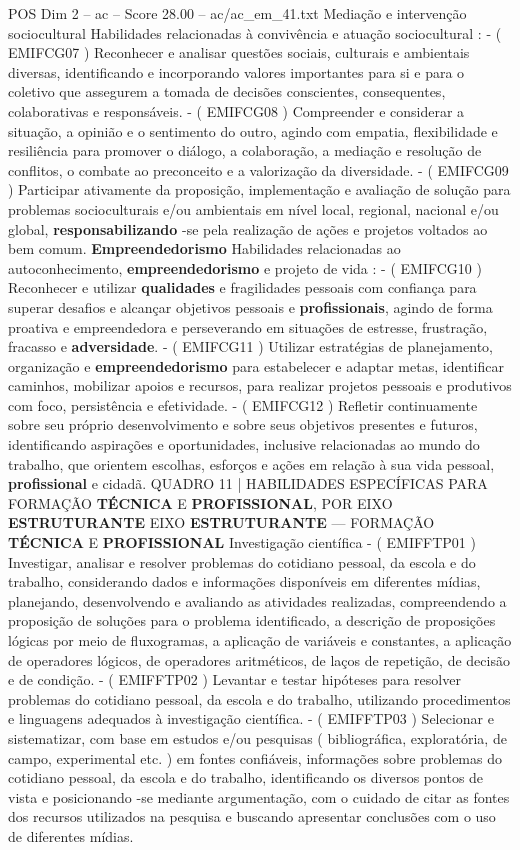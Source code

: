 \begin{textsample}{POS Dim 2 – ac – Score 28.00 – ac/ac\_em\_41.txt}
Mediação e intervenção sociocultural Habilidades relacionadas à convivência e atuação sociocultural : - ( EMIFCG07 ) Reconhecer e analisar questões sociais, culturais e ambientais diversas, identificando e incorporando valores importantes para si e para o coletivo que assegurem a tomada de decisões conscientes, consequentes, colaborativas e responsáveis. - ( EMIFCG08 ) Compreender e considerar a situação, a opinião e o sentimento do outro, agindo com empatia, flexibilidade e resiliência para promover o diálogo, a colaboração, a mediação e resolução de conflitos, o combate ao preconceito e a valorização da diversidade. - ( EMIFCG09 ) Participar ativamente da proposição, implementação e avaliação de solução para problemas socioculturais e/ou ambientais em nível local, regional, nacional e/ou global, \textbf{responsabilizando} -se pela realização de ações e projetos voltados ao bem comum. \textbf{Empreendedorismo} Habilidades relacionadas ao autoconhecimento, \textbf{empreendedorismo} e projeto de vida : - ( EMIFCG10 ) Reconhecer e utilizar \textbf{qualidades} e fragilidades pessoais com confiança para superar desafios e alcançar objetivos pessoais e \textbf{profissionais}, agindo de forma proativa e empreendedora e perseverando em situações de estresse, frustração, fracasso e \textbf{adversidade}. - ( EMIFCG11 ) Utilizar estratégias de planejamento, organização e \textbf{empreendedorismo} para estabelecer e adaptar metas, identificar caminhos, mobilizar apoios e recursos, para realizar projetos pessoais e produtivos com foco, persistência e efetividade. - ( EMIFCG12 ) Refletir continuamente sobre seu próprio desenvolvimento e sobre seus objetivos presentes e futuros, identificando aspirações e oportunidades, inclusive relacionadas ao mundo do trabalho, que orientem escolhas, esforços e ações em relação à sua vida pessoal, \textbf{profissional} e cidadã.
QUADRO 11 | HABILIDADES ESPECÍFICAS PARA FORMAÇÃO \textbf{TÉCNICA} E \textbf{PROFISSIONAL}, POR EIXO \textbf{ESTRUTURANTE} EIXO \textbf{ESTRUTURANTE} — FORMAÇÃO \textbf{TÉCNICA} E \textbf{PROFISSIONAL} Investigação científica - ( EMIFFTP01 ) Investigar, analisar e resolver problemas do cotidiano pessoal, da escola e do trabalho, considerando dados e informações disponíveis em diferentes mídias, planejando, desenvolvendo e avaliando as atividades realizadas, compreendendo a proposição de soluções para o problema identificado, a descrição de proposições lógicas por meio de fluxogramas, a aplicação de variáveis e constantes, a aplicação de operadores lógicos, de operadores aritméticos, de laços de repetição, de decisão e de condição. - ( EMIFFTP02 ) Levantar e testar hipóteses para resolver problemas do cotidiano pessoal, da escola e do trabalho, utilizando procedimentos e linguagens adequados à investigação científica. - ( EMIFFTP03 ) Selecionar e sistematizar, com base em estudos e/ou pesquisas ( bibliográfica, exploratória, de campo, experimental etc. ) em fontes confiáveis, informações sobre problemas do cotidiano pessoal, da escola e do trabalho, identificando os diversos pontos de vista e posicionando -se mediante argumentação, com o cuidado de citar as fontes dos recursos utilizados na pesquisa e buscando apresentar conclusões com o uso de diferentes mídias.

\end{textsample}
